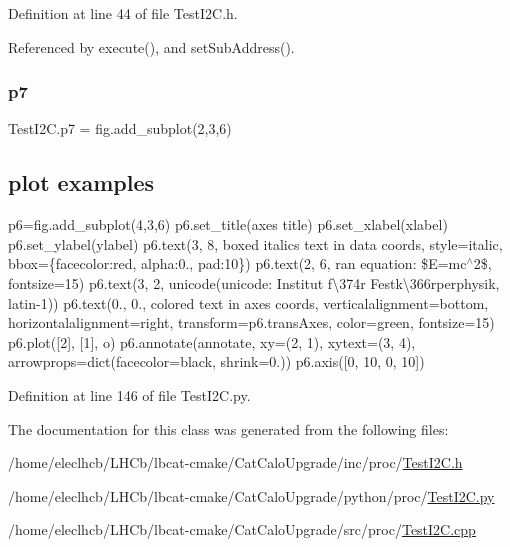 Definition at line 44 of file Test\+I2\+C.\+h.



Referenced by execute(), and set\+Sub\+Address().

\mbox{\label{classTestI2C_a997a17364d4aa4e3bbd30f306644b076}} 
\subsubsection{\texorpdfstring{p7}{p7}}
{\footnotesize\ttfamily Test\+I2\+C.\+p7 = fig.\+add\+\_\+subplot(2,3,6)}



\subsection*{plot examples}

p6=fig.\+add\+\_\+subplot(4,3,6) p6.\+set\+\_\+title(\textquotesingle{}axes title\textquotesingle{}) p6.\+set\+\_\+xlabel(\textquotesingle{}xlabel\textquotesingle{}) p6.\+set\+\_\+ylabel(\textquotesingle{}ylabel\textquotesingle{}) p6.\+text(3, 8, \textquotesingle{}boxed italics text in data coords\textquotesingle{}, style=\textquotesingle{}italic\textquotesingle{}, bbox=\{\textquotesingle{}facecolor\textquotesingle{}\+:\textquotesingle{}red\textquotesingle{}, \textquotesingle{}alpha\textquotesingle{}\+:0., \textquotesingle{}pad\textquotesingle{}\+:10\}) p6.\+text(2, 6, r\textquotesingle{}an equation\+: \$E=mc$^\wedge$2\$\textquotesingle{}, fontsize=15) p6.\+text(3, 2, unicode(\textquotesingle{}unicode\+: Institut f\textbackslash{}374r Festk\textbackslash{}366rperphysik\textquotesingle{}, \textquotesingle{}latin-\/1\textquotesingle{})) p6.\+text(0., 0., \textquotesingle{}colored text in axes coords\textquotesingle{}, verticalalignment=\textquotesingle{}bottom\textquotesingle{}, horizontalalignment=\textquotesingle{}right\textquotesingle{}, transform=p6.\+trans\+Axes, color=\textquotesingle{}green\textquotesingle{}, fontsize=15) p6.\+plot(\mbox{[}2\mbox{]}, \mbox{[}1\mbox{]}, \textquotesingle{}o\textquotesingle{}) p6.\+annotate(\textquotesingle{}annotate\textquotesingle{}, xy=(2, 1), xytext=(3, 4), arrowprops=dict(facecolor=\textquotesingle{}black\textquotesingle{}, shrink=0.)) p6.\+axis(\mbox{[}0, 10, 0, 10\mbox{]}) 



Definition at line 146 of file Test\+I2\+C.\+py.



The documentation for this class was generated from the following files\+:\begin{DoxyCompactItemize}
\item 
/home/eleclhcb/\+L\+H\+Cb/lbcat-\/cmake/\+Cat\+Calo\+Upgrade/inc/proc/\hyperlink{TestI2C_8h}{Test\+I2\+C.\+h}\item 
/home/eleclhcb/\+L\+H\+Cb/lbcat-\/cmake/\+Cat\+Calo\+Upgrade/python/proc/\hyperlink{TestI2C_8py}{Test\+I2\+C.\+py}\item 
/home/eleclhcb/\+L\+H\+Cb/lbcat-\/cmake/\+Cat\+Calo\+Upgrade/src/proc/\hyperlink{TestI2C_8cpp}{Test\+I2\+C.\+cpp}\end{DoxyCompactItemize}
